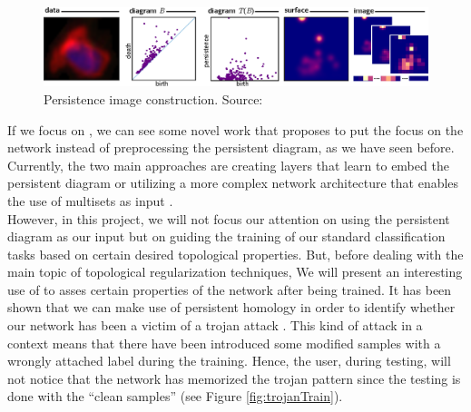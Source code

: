 \documentclass[../main.tex]{subfiles}
\begin{document}
\begin{itemize}
    \begin{figure}[!ht]
        \centering
        \includegraphics[width=\textwidth]{figures/bg/persImage.png} 
        \caption{Persistence image construction. Source: \cite{adams_persistence_2016}}
        \label{fig:persImages}
    \end{figure}
    
\end{itemize}

If we focus on , we can see some novel work that proposes to put the focus on the network instead of preprocessing the persistent diagram, as we have seen before. Currently, the two main approaches are creating layers that learn to embed the persistent diagram or utilizing a more complex network architecture that enables the use of multisets as input \cite{hensel_survey_2021}.\\

However, in this project, we will not focus our attention on using the persistent diagram as our input but on guiding the training of our standard classification tasks based on certain desired topological properties. But, before dealing with the main topic of topological regularization techniques, We will present an interesting use of  to asses certain properties of the network after being trained. It has been shown that we can make use of persistent homology in order to identify whether our network has been a victim of a trojan attack \cite{zheng_topological_2022}. This kind of attack in a  context means that there have been introduced some modified samples with a wrongly attached label during the training. Hence, the user, during testing, will not notice that the network has memorized the trojan pattern since the testing is done with the ``clean samples'' (see Figure \ref{fig:trojanTrain}).
\end{document}
